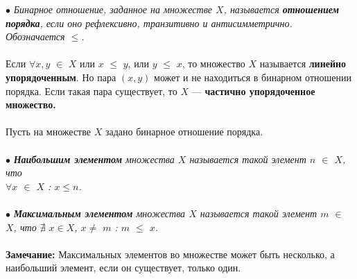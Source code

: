 $\bullet$ \textit{Бинарное отношение, заданное на множестве $X$, называется \textbf{отношением порядка}, если оно рефлексивно, транзитивно и антисимметрично. Обозначается $\le$.}\\\\
Если $\forall x,y$ $\in$ $X$ или $x$ $\le$ $y$, или $y$ $\le$ $x$, то множество $X$ называется \textbf{линейно упорядоченным}. Но пара $(x,y)$ может и не находиться в бинарном отношении порядка. Если такая пара существует, то $X$ --- \textbf{частично упорядоченное множество.}\\\\
Пусть на множестве $X$ задано бинарное отношение порядка.\\\\
$\bullet$ \textit{\textbf{Наибольшим элементом} множества $X$ называется такой элемент $n$ $\in$ $X$, что \\ $\forall x$ $\in$ $X$ : $x\le n$.}\\\\
$\bullet$ \textit{\textbf{Максимальным элементом} множества $X$ называется такой элемент $m$ $\in$ $X$, что $\nexists$ $x\in X$,  $x\not=$ $m$ : $m$ $\le$ $x$.}\\\\
\textbf{Замечание:} Максимальных элементов во множестве может быть несколько, а наибольший элемент, если он существует, только один.





